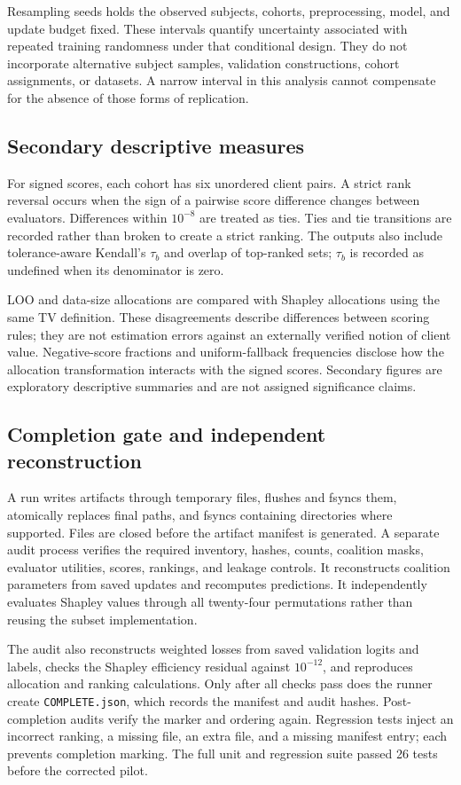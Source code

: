 \documentclass[conference,letterpaper]{IEEEtran}
\begin{document}
Resampling seeds holds the observed subjects, cohorts, preprocessing, model, and update budget fixed. These intervals quantify uncertainty associated with repeated training randomness under that conditional design. They do not incorporate alternative subject samples, validation constructions, cohort assignments, or datasets. A narrow interval in this analysis cannot compensate for the absence of those forms of replication.

\subsection{Secondary descriptive measures}
For signed scores, each cohort has six unordered client pairs. A strict rank reversal occurs when the sign of a pairwise score difference changes between evaluators. Differences within $10^{-8}$ are treated as ties. Ties and tie transitions are recorded rather than broken to create a strict ranking. The outputs also include tolerance-aware Kendall's $\tau_b$ and overlap of top-ranked sets; $\tau_b$ is recorded as undefined when its denominator is zero.

LOO and data-size allocations are compared with Shapley allocations using the same TV definition. These disagreements describe differences between scoring rules; they are not estimation errors against an externally verified notion of client value. Negative-score fractions and uniform-fallback frequencies disclose how the allocation transformation interacts with the signed scores. Secondary figures are exploratory descriptive summaries and are not assigned significance claims.

\subsection{Completion gate and independent reconstruction}
A run writes artifacts through temporary files, flushes and fsyncs them, atomically replaces final paths, and fsyncs containing directories where supported. Files are closed before the artifact manifest is generated. A separate audit process verifies the required inventory, hashes, counts, coalition masks, evaluator utilities, scores, rankings, and leakage controls. It reconstructs coalition parameters from saved updates and recomputes predictions. It independently evaluates Shapley values through all twenty-four permutations rather than reusing the subset implementation.

The audit also reconstructs weighted losses from saved validation logits and labels, checks the Shapley efficiency residual against $10^{-12}$, and reproduces allocation and ranking calculations. Only after all checks pass does the runner create \texttt{COMPLETE.json}, which records the manifest and audit hashes. Post-completion audits verify the marker and ordering again. Regression tests inject an incorrect ranking, a missing file, an extra file, and a missing manifest entry; each prevents completion marking. The full unit and regression suite passed 26 tests before the corrected pilot.
\end{document}
